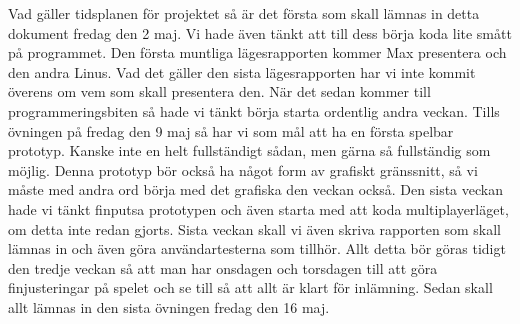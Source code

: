 \documentclass[10pt,twoside,a4paper]{article}
\begin{document}
Vad gäller tidsplanen för projektet så är det första som skall lämnas in
detta dokument fredag den 2 maj. Vi hade även tänkt att till dess börja
koda lite smått på programmet. Den första muntliga lägesrapporten kommer
Max presentera och den andra Linus. Vad det gäller den sista lägesrapporten
har vi inte kommit överens om vem som skall presentera den. När det sedan
kommer till programmeringsbiten så hade vi tänkt börja starta ordentlig
andra veckan. Tills övningen på fredag den 9 maj så har vi som mål att ha
en första spelbar prototyp. Kanske inte en helt fullständigt sådan, men
gärna så fullständig som möjlig. Denna prototyp bör också ha något form av
grafiskt gränssnitt, så vi måste med andra ord börja med det grafiska den
veckan också. Den sista veckan hade vi tänkt finputsa prototypen och även
starta med att koda multiplayerläget, om detta inte redan gjorts. Sista
veckan skall vi även skriva rapporten som skall lämnas in och även göra
användartesterna som tillhör. Allt detta bör göras tidigt den tredje veckan
så att man har onsdagen och torsdagen till att göra finjusteringar på
spelet och se till så att allt är klart för inlämning. Sedan skall allt
lämnas in den sista övningen fredag den 16 maj.
\end{document}
